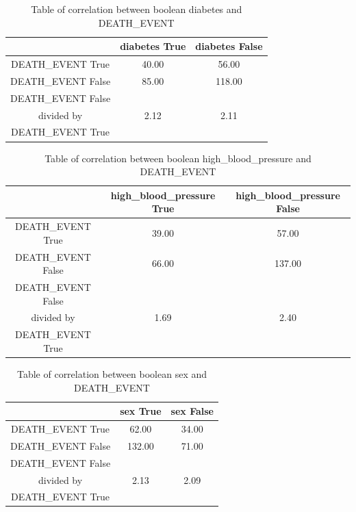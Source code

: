 \documentclass[a4paper, UKenglish]{article}
\newcommand{\0}{\mathbf{0}}
\newcommand{\1}{\mathbf{1}}
\begin{document}
\begin{table}[H]
\centering
\caption{Table of correlation between boolean diabetes and DEATH\_EVENT}
\label{tab:diabetes}
\begin{tabular}{|c||c|c|}
    \hline
       & diabetes True   & diabetes False   \\
    \hline
    \hline
    DEATH{\_}EVENT True & 40.00  & 56.00 \\
    \hline
    DEATH{\_}EVENT False & 85.00 & 118.00  \\
    \hline
    \hline
    DEATH{\_}EVENT False & & \\
    divided by & 2.12 & 2.11 \\
    DEATH{\_}EVENT True & & \\
    \hline
\end{tabular}
\end{table}


\begin{table}[H]
\centering
\caption{Table of correlation between boolean high{\_}blood{\_}pressure and DEATH\_EVENT}
\label{tab:high_blood_pressure}
\begin{tabular}{|c||c|c|}
    \hline
       & high{\_}blood{\_}pressure True   & high{\_}blood{\_}pressure False   \\
    \hline
    \hline
    DEATH{\_}EVENT True & 39.00  & 57.00 \\
    \hline
    DEATH{\_}EVENT False & 66.00 & 137.00  \\
    \hline
    \hline
    DEATH{\_}EVENT False & & \\
    divided by & 1.69 & 2.40 \\
    DEATH{\_}EVENT True & & \\
    \hline
\end{tabular}
\end{table}


\begin{table}[H]
\centering
\caption{Table of correlation between boolean sex and DEATH\_EVENT}
\label{tab:sex}
\begin{tabular}{|c||c|c|}
    \hline
       & sex True   & sex False   \\
    \hline
    \hline
    DEATH{\_}EVENT True & 62.00  & 34.00 \\
    \hline
    DEATH{\_}EVENT False & 132.00 & 71.00  \\
    \hline
    \hline
    DEATH{\_}EVENT False & & \\
    divided by & 2.13 & 2.09 \\
    DEATH{\_}EVENT True & & \\
    \hline
\end{tabular}
\end{table}
\end{document}
